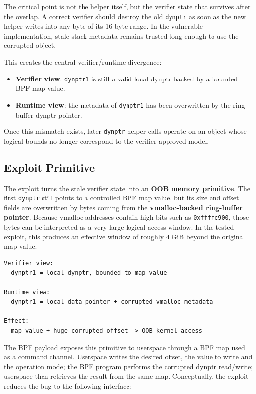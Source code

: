 \documentclass[../main.tex]{subfiles}
\begin{document}
The critical point is not the helper itself, but the verifier state that survives after the overlap. A correct verifier should destroy the old \texttt{dynptr} as soon as the new helper writes into any byte of its 16-byte range. In the vulnerable implementation, stale stack metadata remains trusted long enough to use the corrupted object.

This creates the central verifier/runtime divergence:

\begin{itemize}
    \item \textbf{Verifier view}: \texttt{dynptr1} is still a valid local dynptr backed by a bounded BPF map value.
    \item \textbf{Runtime view}: the metadata of \texttt{dynptr1} has been overwritten by the ring-buffer dynptr pointer.
\end{itemize}

Once this mismatch exists, later \texttt{dynptr} helper calls operate on an object whose logical bounds no longer correspond to the verifier-approved model.

\subsection{Exploit Primitive}

The exploit turns the stale verifier state into an \textbf{OOB memory primitive}. The first \texttt{dynptr} still points to a controlled BPF map value, but its size and offset fields are overwritten by bytes coming from the \textbf{vmalloc-backed ring-buffer pointer}. Because vmalloc addresses contain high bits such as \texttt{0xffffc900}, those bytes can be interpreted as a very large logical access window. In the tested exploit, this produces an effective window of roughly 4 GiB beyond the original map value.

\begin{lstlisting}[caption={Verifier/runtime divergence.}]
Verifier view:
  dynptr1 = local dynptr, bounded to map_value

Runtime view:
  dynptr1 = local data pointer + corrupted vmalloc metadata

Effect:
  map_value + huge corrupted offset -> OOB kernel access
\end{lstlisting}

The BPF payload exposes this primitive to userspace through a BPF map used as a command channel. Userspace writes the desired offset, the value to write and the operation mode; the BPF program performs the corrupted dynptr read/write; userspace then retrieves the result from the same map. Conceptually, the exploit reduces the bug to the following interface:
\end{document}
